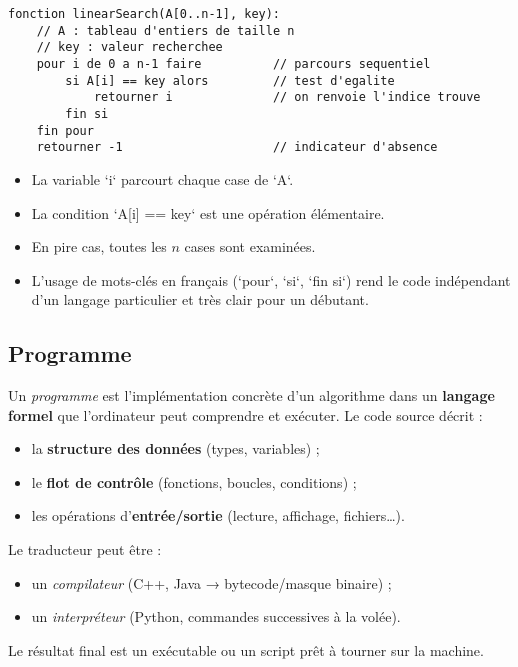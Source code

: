 \begin{lstlisting}[mathescape=true]
fonction linearSearch(A[0..n-1], key):
    // A : tableau d'entiers de taille n
    // key : valeur recherchee
    pour i de 0 a n-1 faire          // parcours sequentiel
        si A[i] == key alors         // test d'egalite
            retourner i              // on renvoie l'indice trouve
        fin si
    fin pour
    retourner -1                     // indicateur d'absence
\end{lstlisting}

\noindent
\begin{itemize}
 \item La variable `i` parcourt chaque case de `A`.
 \item La condition `A[i] == key` est une opération élémentaire.
 \item En pire cas, toutes les \(n\) cases sont examinées.
 \item L’usage de mots-clés en français (`pour`, `si`, `fin si`) rend le code
  indépendant d’un langage particulier et très clair pour un débutant.
\end{itemize}

\subsection{Programme}
Un \emph{programme} est l’implémentation concrète d’un algorithme dans un
\textbf{langage formel} que l’ordinateur peut comprendre et exécuter.
Le code source décrit :
\begin{itemize}
  \item la \textbf{structure des données} (types, variables) ;
  \item le \textbf{flot de contrôle} (fonctions, boucles, conditions) ;
  \item les opérations d’\textbf{entrée/sortie} (lecture, affichage, fichiers…).
\end{itemize}
Le traducteur peut être :
\begin{itemize}
  \item un \emph{compilateur} (C++, Java → bytecode/masque binaire) ;
  \item un \emph{interpréteur} (Python, commandes successives à la volée).
\end{itemize}
Le résultat final est un exécutable ou un script prêt à tourner sur la machine.

